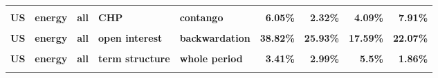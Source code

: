 \documentclass[
  authoryear,
  preprint,
  3p]{elsarticle}
\begin{document}
\begin{landscape}
\begin{longtable}[t]{>{}l>{}l>{}l>{}l>{}l>{}r>{}r>{}r>{}r}
\textbf{\cellcolor{gray!10}{US}} & \textbf{\cellcolor{gray!10}{energy}} & \textbf{\cellcolor{gray!10}{all}} & \textbf{\cellcolor{gray!10}{CHP}} & \textbf{\cellcolor{gray!10}{backwardation}} & \textcolor[HTML]{4285f4}{\textbf{\cellcolor{gray!10}{12.81\%}}} & \textcolor[HTML]{4285f4}{\textbf{\cellcolor{gray!10}{1.01\%}}} & \textcolor[HTML]{4285f4}{\textbf{\cellcolor{gray!10}{2.97\%}}} & \textcolor[HTML]{4285f4}{\textbf{\cellcolor{gray!10}{5.68\%}}}\\
\textbf{US} & \textbf{energy} & \textbf{all} & \textbf{CHP} & \textbf{contango} & \textcolor[HTML]{4285f4}{\textbf{6.05\%}} & \textcolor[HTML]{4285f4}{\textbf{2.32\%}} & \textcolor[HTML]{4285f4}{\textbf{4.09\%}} & \textcolor[HTML]{4285f4}{\textbf{7.91\%}}\\
\textbf{\cellcolor{gray!10}{US}} & \textbf{\cellcolor{gray!10}{energy}} & \textbf{\cellcolor{gray!10}{all}} & \textbf{\cellcolor{gray!10}{open interest}} & \textbf{\cellcolor{gray!10}{whole period}} & \textcolor[HTML]{4285f4}{\textbf{\cellcolor{gray!10}{40\%}}} & \textcolor[HTML]{4285f4}{\textbf{\cellcolor{gray!10}{33.46\%}}} & \textcolor[HTML]{4285f4}{\textbf{\cellcolor{gray!10}{21.16\%}}} & \textcolor[HTML]{4285f4}{\textbf{\cellcolor{gray!10}{27.67\%}}}\\
\textbf{US} & \textbf{energy} & \textbf{all} & \textbf{open interest} & \textbf{backwardation} & \textcolor[HTML]{4285f4}{\textbf{38.82\%}} & \textcolor[HTML]{4285f4}{\textbf{25.93\%}} & \textcolor[HTML]{4285f4}{\textbf{17.59\%}} & \textcolor[HTML]{4285f4}{\textbf{22.07\%}}\\
\addlinespace
\textbf{\cellcolor{gray!10}{US}} & \textbf{\cellcolor{gray!10}{energy}} & \textbf{\cellcolor{gray!10}{all}} & \textbf{\cellcolor{gray!10}{open interest}} & \textbf{\cellcolor{gray!10}{contango}} & \textcolor[HTML]{4285f4}{\textbf{\cellcolor{gray!10}{41.02\%}}} & \textcolor[HTML]{4285f4}{\textbf{\cellcolor{gray!10}{40.42\%}}} & \textcolor[HTML]{4285f4}{\textbf{\cellcolor{gray!10}{23.88\%}}} & \textcolor[HTML]{4285f4}{\textbf{\cellcolor{gray!10}{32.13\%}}}\\
\textbf{US} & \textbf{energy} & \textbf{all} & \textbf{term structure} & \textbf{whole period} & \textcolor[HTML]{4285f4}{\textbf{3.41\%}} & \textcolor[HTML]{4285f4}{\textbf{2.99\%}} & \textcolor[HTML]{4285f4}{\textbf{5.5\%}} & \textcolor[HTML]{4285f4}{\textbf{1.86\%}}\\
\textbf{\cellcolor{gray!10}{US}} & \textbf{\cellcolor{gray!10}{energy}} & \textbf{\cellcolor{gray!10}{all}} & \textbf{\cellcolor{gray!10}{term structure}} & \textbf{\cellcolor{gray!10}{backwardation}} & \textcolor[HTML]{4285f4}{\textbf{\cellcolor{gray!10}{7.4\%}}} & \textcolor[HTML]{4285f4}{\textbf{\cellcolor{gray!10}{3.75\%}}} & \textcolor[HTML]{4285f4}{\textbf{\cellcolor{gray!10}{4.93\%}}} & \textcolor[HTML]{4285f4}{\textbf{\cellcolor{gray!10}{3.4\%}}}\\

\end{longtable}
\end{landscape}
\end{document}
